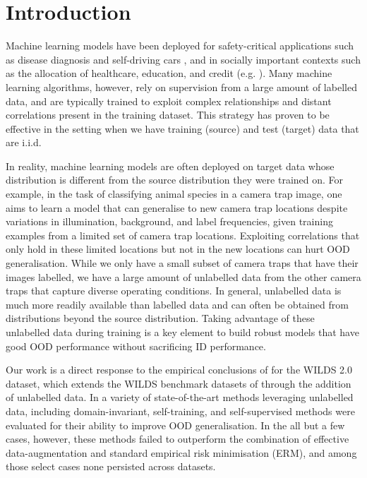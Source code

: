\section{Introduction}\label{sec:intro}
Machine learning models have been deployed for safety-critical applications such as disease
diagnosis \citep{watson2019clinical} and self-driving cars \citep{yu2020bdd100k}, and in socially
important contexts such as the allocation of healthcare, education, and credit (e.g.
\cite{DunYiLanReetal19, HurAde17}). 
%
%
Many machine learning algorithms, however, rely on supervision from a large amount of labelled
data, and are typically trained to exploit complex relationships and distant correlations present
in the training dataset. 
%
This strategy has proven to be effective in the setting when we have training (source) and test
(target) data that are i.i.d.

In reality, machine learning models are often deployed on target data whose distribution is
different from the source distribution they were trained on. 
%
For example, in the task of classifying animal species in a camera trap image, one aims to learn a
model that can generalise to new camera trap locations despite variations in illumination,
background, and label frequencies, given training examples from a limited set of camera trap
locations.
%
Exploiting correlations that only hold in these limited locations but not in the new locations can
hurt \ac{OOD} generalisation.
%
While we only have a small subset of camera traps that have their images labelled, we have a large
amount of unlabelled data from the other camera traps that capture diverse operating conditions. 
%
In general, unlabelled data is much more readily available than labelled data and can often be
obtained from distributions beyond the source distribution.
%
Taking advantage of these unlabelled data during training is a key element to build robust models
that have good OOD performance without sacrificing \ac{ID} performance.
%

Our work is a direct response to the empirical conclusions of \cite{SagWeiLeeGaoetal22} for the
WILDS 2.0 dataset, which extends the WILDS benchmark datasets of \cite{koh2021wilds} through the
addition of unlabelled data. %
In \citet{SagWeiLeeGaoetal22} a variety of state-of-the-art methods leveraging unlabelled data, including
domain-invariant, self-training, and self-supervised methods were evaluated for their ability to
improve OOD generalisation.
In the all but a few cases, however, these methods failed to outperform the combination of effective
data-augmentation and standard empirical risk minimisation (ERM), and among those select cases
none persisted across datasets.

